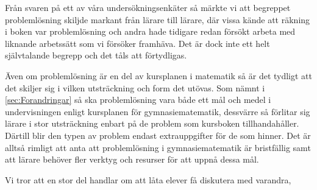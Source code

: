 \textcolor{Mahogany}{Från svaren på ett av våra undersökningsenkäter så märkte vi att begreppet problemlösning skiljde markant från lärare till lärare, där vissa kände att räkning i boken var problemlösning och andra hade tidigare redan försökt arbeta med liknande arbetssätt som vi försöker framhäva. Det är dock inte ett helt självtalande begrepp och det tåls att förtydligas.}

\textcolor{Mahogany}{Även om problemlösning är en del av kursplanen i matematik så är det tydligt att det skiljer sig i vilken utsträckning och form det utövas. Som nämnt i \ref{sec:Forandringar} så ska problemlösning vara både ett mål och medel i undervisningen enligt kursplanen för gymnasiematematik, dessvärre så förlitar sig lärare i stor utsträckning enbart på de problem som kursboken tillhandahåller. Därtill blir den typen av problem endast extrauppgifter för de som hinner\cite{2010UndervisningenGymnasieskolan}. Det är alltså rimligt att anta att problemlösning i gymnasiematematik är bristfällig samt att lärare behöver fler verktyg och resurser för att uppnå dessa mål.}

\textcolor{Mahogany}{Vi tror att en stor del handlar om att låta elever få diskutera med varandra,}
